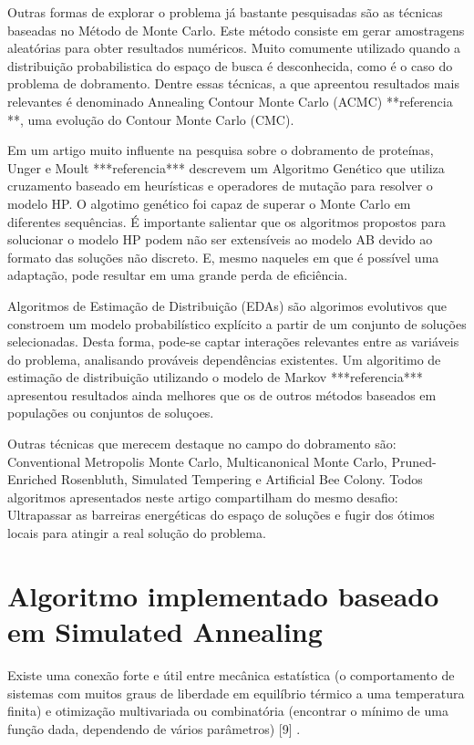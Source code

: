 \documentclass[dm,ppgcomp]{texfurg}
\begin{document}
Outras formas de explorar o problema já bastante pesquisadas são as técnicas baseadas no Método de Monte Carlo. Este método consiste em gerar amostragens aleatórias para obter resultados numéricos. Muito comumente utilizado quando a distribuição probabilistica do espaço de busca é desconhecida, como é o caso do problema de dobramento. Dentre essas técnicas, a que apreentou resultados mais relevantes é denominado Annealing Contour Monte Carlo (ACMC) **referencia **, uma evolução do Contour Monte Carlo (CMC).

Em um artigo muito influente na pesquisa sobre o dobramento de proteínas, Unger e Moult ***referencia*** descrevem um Algoritmo Genético que utiliza cruzamento baseado em heurísticas e operadores de mutação para resolver o modelo HP. O algotimo genético foi capaz de superar o Monte Carlo em diferentes sequências. É importante salientar que os algoritmos propostos para solucionar o modelo HP podem não ser extensíveis ao modelo AB devido ao formato das soluções não discreto. E, mesmo naqueles em que é possível uma adaptação, pode resultar em uma grande perda de eficiência.

Algoritmos de Estimação de Distribuição (EDAs) são algorimos evolutivos que constroem um modelo probabilístico explícito a partir de um conjunto de soluções selecionadas. Desta forma, pode-se captar interações relevantes entre as variáveis do problema, analisando prováveis dependências existentes. Um algoritimo de estimação de distribuição utilizando o modelo de Markov ***referencia*** apresentou resultados ainda melhores que os de outros métodos baseados em populações ou conjuntos de soluçoes.

Outras técnicas que merecem destaque no campo do dobramento são: Conventional Metropolis Monte Carlo, Multicanonical Monte Carlo, Pruned-Enriched Rosenbluth, Simulated Tempering e Artificial Bee Colony. Todos algoritmos apresentados neste artigo compartilham do mesmo desafio: Ultrapassar as barreiras energéticas do espaço de soluções e fugir dos ótimos locais para atingir a real solução do problema. 

\chapter{Algoritmo implementado baseado em Simulated Annealing}

Existe uma conexão forte e útil entre mecânica estatística (o comportamento de sistemas com muitos graus de liberdade em equilíbrio térmico a uma temperatura finita) e otimização multivariada ou combinatória (encontrar o mínimo de uma função dada, dependendo de vários parâmetros) [9] .
\end{document}
